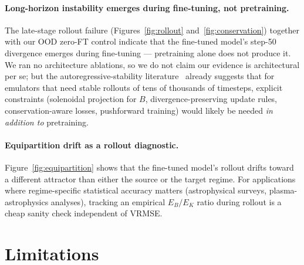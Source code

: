 \documentclass{article}
\begin{document}
\paragraph{Long-horizon instability emerges during fine-tuning, not pretraining.} The late-stage rollout failure (Figures~\ref{fig:rollout} and~\ref{fig:conservation}) together with our OOD zero-FT control indicate that the fine-tuned model's step-50 divergence emerges during fine-tuning --- pretraining alone does not produce it. We ran no architecture ablations, so we do not claim our evidence is architectural per se; but the autoregressive-stability literature~\cite{mccabe2023stability,lippe2023pderefiner,brandstetter2022pushforward} already suggests that for emulators that need stable rollouts of tens of thousands of timesteps, explicit constraints (solenoidal projection for $B$, divergence-preserving update rules, conservation-aware losses, pushforward training) would likely be needed \emph{in addition to} pretraining.

\paragraph{Equipartition drift as a rollout diagnostic.} Figure~\ref{fig:equipartition} shows that the fine-tuned model's rollout drifts toward a different attractor than either the source or the target regime. For applications where regime-specific statistical accuracy matters (astrophysical surveys, plasma-astrophysics analyses), tracking an empirical $E_B/E_K$ ratio during rollout is a cheap sanity check independent of VRMSE.

\section{Limitations}
\end{document}
